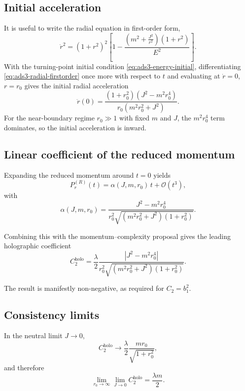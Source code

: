 \documentclass[11pt,a4paper]{article}
\theoremstyle{plain}
\theoremstyle{definition}
\theoremstyle{remark}
\newcommand{\PrR}{P_r^{(R)}}
\begin{document}
\subsection{Initial acceleration}

It is useful to write the radial equation in first-order form,
\begin{equation}
\dot r^2
=
(1+r^2)^2
\left[
1-\frac{
\left(m^2+\frac{J^2}{r^2}\right)(1+r^2)
}{E^2}
\right].
\label{eq:ads3-radial-firstorder}
\end{equation}
With the turning-point initial condition \eqref{eq:ads3-energy-initial}, differentiating \eqref{eq:ads3-radial-firstorder} once more with respect to $t$ and evaluating at $\dot r=0$, $r=r_0$ gives the initial radial acceleration
\begin{equation*}
\boxed{
\ddot r(0)
=
\frac{
(1+r_0^2)(J^2-m^2r_0^4)
}{
r_0(m^2r_0^2+J^2)
}.
}
\end{equation*}
For the near-boundary regime $r_0\gg1$ with fixed $m$ and $J$, the $m^2r_0^4$ term dominates, so the initial acceleration is inward.

\subsection{Linear coefficient of the reduced momentum}

Expanding the reduced momentum around $t=0$ yields
\begin{equation*}
\PrR(t)
=
\alpha(J,m,r_0)\,t+\mathcal O(t^3),
\end{equation*}
with
\begin{equation}
\boxed{
\alpha(J,m,r_0)
=
\frac{
J^2-m^2r_0^4
}{
r_0^2
\sqrt{
(m^2r_0^2+J^2)(1+r_0^2)
}
}.
}
\label{eq:ads3-alpha}
\end{equation}

Combining this with the momentum--complexity proposal gives the leading holographic coefficient
\begin{equation*}
\boxed{
C_2^{\mathrm{holo}}
=
\frac{\lambda}{2}
\frac{
|J^2-m^2r_0^4|
}{
r_0^2
\sqrt{
(m^2r_0^2+J^2)(1+r_0^2)
}
}.
}
\end{equation*}

The result is manifestly non-negative, as required for $C_2=b_1^2$.

\subsection{Consistency limits}

In the neutral limit $J\to0$,
\begin{equation*}
C_2^{\mathrm{holo}}
\longrightarrow
\frac{\lambda}{2}
\frac{mr_0}{\sqrt{1+r_0^2}},
\end{equation*}
and therefore
\begin{equation*}
\lim_{r_0\to\infty}\lim_{J\to0}
C_2^{\mathrm{holo}}
=
\frac{\lambda m}{2}.
\end{equation*}
\end{document}
